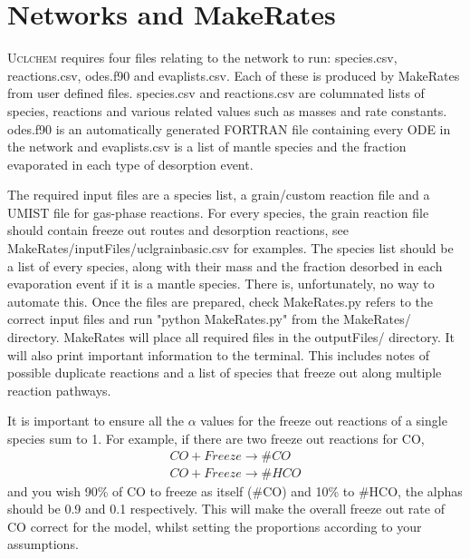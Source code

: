 \documentclass{llncs}
\begin{document}
\section{Networks and MakeRates}
\label{sec:network}
\textsc{Uclchem} requires four files relating to the network to run: species.csv, reactions.csv, odes.f90 and evaplists.csv. Each of these is produced by MakeRates from user defined files. species.csv and reactions.csv are columnated lists of species, reactions and various related values such as masses and rate constants. odes.f90 is an automatically generated FORTRAN file containing every ODE in the network and evaplists.csv is a list of mantle species and the fraction evaporated in each type of desorption event.\par
The required input files are a species list, a grain/custom reaction file and a UMIST file for gas-phase reactions. For every species, the grain reaction file should contain freeze out routes and desorption reactions, see MakeRates/inputFiles/uclgrainbasic.csv for examples. The species list should be a list of every species, along with their mass and the fraction desorbed in each evaporation event if it is a mantle species. There is, unfortunately, no way to automate this. Once the files are prepared, check MakeRates.py refers to the correct input files and run "python MakeRates.py" from the MakeRates/ directory. MakeRates will place all required files in the outputFiles/ directory. It will also print important information to the terminal. This includes notes of possible duplicate reactions and a list of species that freeze out along multiple reaction pathways. \par
It is important to ensure all the $\alpha$ values for the freeze out reactions of a single species sum to 1. For example, if there are two freeze out reactions for CO,
\begin{eqnarray}
CO + Freeze \rightarrow \#CO \\
CO + Freeze \rightarrow \#HCO
\end{eqnarray}
 and you wish 90\% of CO to freeze as itself (\#CO) and 10\% to \#HCO, the alphas should be 0.9 and 0.1 respectively. This will make the overall freeze out rate of CO correct for the model, whilst setting the proportions according to your assumptions.     
%
%
\end{document}
